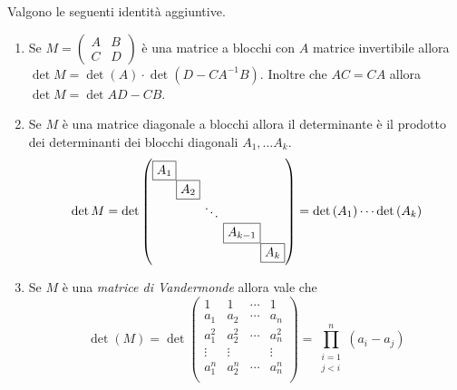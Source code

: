 \begin{propriety}
	Valgono le seguenti identità aggiuntive. 
	\begin{enumerate}
		\item Se $ M = \begin{pmatrix}
		A & B \\
		C & D
		\end{pmatrix} $	
		è una matrice a blocchi con $ A $ matrice invertibile allora $ \det{M} = \det{(A)} \cdot \det{(D - CA^{-1}B)} $. Inoltre che $ AC = CA $ allora $ \det{M} = \det{AD - CB} $. 
		\item Se $ M $ è una matrice diagonale a blocchi allora il determinante è il prodotto dei determinanti dei blocchi diagonali $ A_1, \ldots A_k $. 
		\[\det{M} = \det
		\setlength{\arraycolsep}{0pt}
		\begin{pmatrix}
		\fbox{$ A_1 $}		&		&		&		&		 \\
		& \fbox{$ A_2 $}	&		&		&		 \\
		& 		& \ \ddots \ &		&		 \\	 
		& 		&		& \fbox{$ A_{k - 1} $}		&		 \\	
		& 		& &		& \fbox{$ A_k $}		 \\	 		 		
		\end{pmatrix}
		= \det{(A_1)} \cdots \det{(A_k)}\]
		\item Se $ M $ è una \emph{matrice di Vandermonde} allora vale che 
		\[\det{(M)} = \det 
		\begin{pmatrix}
		1 & 1 & \cdots & 1 \\
		a_1 & a_2 & \cdots & a_n \\
		a_1^{2} & a_2^{2} & \cdots & a_n^{2} \\
		\vdots & \vdots & & \vdots \\
		a_1^{n} & a_2^{n} & \cdots & a_n^{n} \\
		\end{pmatrix} 
		= \prod_{\substack{i = 1 \\ j < i}}^{n} (a_i - a_j)\]
	\end{enumerate}
\end{propriety}